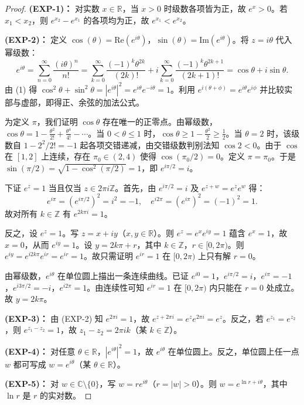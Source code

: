 \documentclass[11pt,a4paper]{article}
\newcommand{\R}{\mathbb{R}}
\newcommand{\C}{\mathbb{C}}
\newcommand{\Z}{\mathbb{Z}}
\renewcommand{\Re}{\mathrm{Re}}
\renewcommand{\Im}{\mathrm{Im}}
\theoremstyle{definition}
\begin{document}
\begin{proof}
\textbf{(EXP-1)：} 对实数 $x \in \R$，当 $x > 0$ 时级数各项皆为正，故 $e^x > 0$。若 $x_1 < x_2$，则 $e^{x_2} - e^{x_1}$ 的各项均为正，故 $e^{x_1} < e^{x_2}$。

\textbf{(EXP-2)：} 定义 $\cos(\theta) = \Re(e^{i\theta})$，$\sin(\theta) = \Im(e^{i\theta})$。将 $z = i\theta$ 代入幂级数：
\[
  e^{i\theta} = \sum_{n=0}^{\infty} \frac{(i\theta)^n}{n!}
  = \sum_{k=0}^{\infty} \frac{(-1)^k \theta^{2k}}{(2k)!}
  + i \sum_{k=0}^{\infty} \frac{(-1)^k \theta^{2k+1}}{(2k+1)!}
  = \cos\theta + i\sin\theta.
  \tag{1}
\]
由 (1) 得 $\cos^2\theta + \sin^2\theta = |e^{i\theta}|^2 = e^{i\theta}e^{-i\theta} = 1$。利用 $e^{i(\theta+\phi)} = e^{i\theta}e^{i\phi}$ 并比较实部与虚部，即得正、余弦的加法公式。

为定义 $\pi$，我们证明 $\cos\theta$ 存在唯一的正零点。由幂级数，$\cos\theta = 1 - \frac{\theta^2}{2!} + \frac{\theta^4}{4!} - \cdots$。当 $0 < \theta \le 1$ 时，$\cos\theta \ge 1 - \frac{\theta^2}{2} \ge \frac{1}{2}$。当 $\theta = 2$ 时，该级数自 $1 - 2^2/2! = -1$ 起各项交错递减，由交错级数判别法知 $\cos 2 < 0$。由于 $\cos$ 在 $[1, 2]$ 上连续，存在 $\pi_0 \in (2, 4)$ 使得 $\cos(\pi_0/2) = 0$。定义 $\pi = \pi_0$。于是 $\sin(\pi/2) = \sqrt{1 - \cos^2(\pi/2)} = 1$，即 $e^{i\pi/2} = i$。

下证 $e^z = 1$ 当且仅当 $z \in 2\pi i\mathbb{Z}$。首先，由 $e^{i\pi/2} = i$ 及 $e^{z+w} = e^z e^w$ 得：
\[
  e^{i\pi} = (e^{i\pi/2})^2 = i^2 = -1, \quad
  e^{i2\pi} = (e^{i\pi})^2 = (-1)^2 = 1.
\]
故对所有 $k \in \mathbb{Z}$ 有 $e^{2k\pi i} = 1$。

反之，设 $e^z = 1$。写 $z = x + iy$（$x, y \in \R$）。则 $e^z = e^x e^{iy} = 1$ 蕴含 $e^x = 1$，故 $x = 0$，从而 $e^{iy} = 1$。设 $y = 2k\pi + r$，其中 $k \in \mathbb{Z}$，$r \in [0, 2\pi)$。则 $e^{iy} = e^{i2k\pi} e^{ir} = e^{ir} = 1$。故只需证明 $e^{ir} = 1$ 在 $[0, 2\pi)$ 上只有解 $r = 0$。

由幂级数，$e^{i\theta}$ 在单位圆上描出一条连续曲线。已证 $e^{i0} = 1$，$e^{i\pi/2} = i$，$e^{i\pi} = -1$，$e^{i3\pi/2} = -i$，$e^{i2\pi} = 1$。由连续性可知 $e^{ir} = 1$ 在 $[0, 2\pi)$ 内只能在 $r = 0$ 处成立。故 $y = 2k\pi$。

\textbf{(EXP-3)：} 由 (EXP-2) 知 $e^{2\pi i} = 1$，故 $e^{z + 2\pi i} = e^z e^{2\pi i} = e^z$。反之，若 $e^{z_1} = e^{z_2}$，则 $e^{z_1 - z_2} = 1$，故 $z_1 - z_2 = 2\pi i k$（某 $k \in \Z$）。

\textbf{(EXP-4)：} 对任意 $\theta \in \R$，$|e^{i\theta}|^2 = 1$，故 $e^{i\theta}$ 在单位圆上。反之，单位圆上任一点 $w$ 都可写成 $w = e^{i\theta}$（某 $\theta \in \R$）。

\textbf{(EXP-5)：} 对 $w \in \C \setminus \{0\}$，写 $w = re^{i\theta}$（$r = |w| > 0$）。则 $w = e^{\ln r + i\theta}$，其中 $\ln r$ 是 $r$ 的实对数。
\end{proof}
\end{document}
